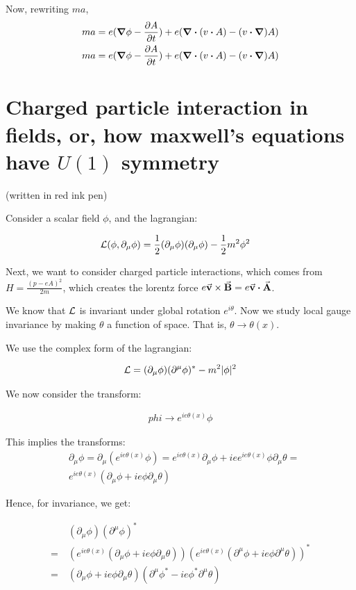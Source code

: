 Now, rewriting $ma$,
\begin{align*}
ma &= e (\grad \phi - \pdv{A}{t}) + e (\div (v \vdot A) - (v \vdot \grad) A) \\
ma &= e (\grad \phi - \pdv{A}{t}) + e (\div (v \vdot A) - (v \vdot \grad) A)
\end{align*}


\chapter{Charged particle interaction in fields, or, how maxwell's equations have $U(1)$ symmetry}
(written in red ink pen)

Consider a scalar field $\phi$, and the lagrangian:

\begin{align*}
    &\mathcal{L}(\phi, \partial_\mu \phi) = \frac{1}{2} (\partial_\mu \phi) (\partial_\mu \phi) - \frac{1}{2} m^2 \phi^2
\end{align*}

Next, we want to consider charged particle interactions, which comes from
$H = \frac{(p - eA)^2}{2m}$, which creates the lorentz force $e \va v \times \va B = e \va v \vdot \va A$.

We know that $\mathcal{L}$ is invariant under global rotation $e^{i \theta}$. Now we
study local gauge invariance by making $\theta$ a function of space. That is,
$\theta \to \theta(x)$.

We use the complex form of the lagrangian:

\begin{align*}
    \mathcal{L} = (\partial_\mu \phi) (\partial^\mu \phi)^* - m^2|\phi|^2
\end{align*}

We now consider the transform:

\begin{align*}
    phi \to e^{i e \theta(x)} \phi
\end{align*}

This implies the transforms:
\begin{align*}
    &\partial_\mu \phi =
    \partial_\mu (e^{i e \theta(x)} \phi) =
    e^{i e \theta(x)} \partial_\mu \phi + i e e^{i e \theta(x)} \phi \partial_\mu \theta = \\
    &e^{i e \theta(x)}(\partial_\mu \phi + i e \phi \partial_\mu \theta)
\end{align*}

Hence, for invariance, we get:

\begin{align*}
    &(\partial_\mu \phi ) (\partial^\mu \phi )^*  \\
    =~&(e^{i e \theta(x)}(\partial_\mu \phi + i e \phi \partial_\mu \theta))
    (e^{i e \theta(x)}(\partial^\mu \phi + i e \phi \partial^\mu \theta))^* \\
     =~&(\partial_\mu \phi + i e \phi \partial_\mu \theta)(\partial^\mu \phi^* - i e \phi^* \partial^\mu \theta)
\end{align*}

